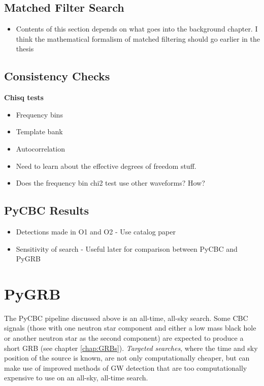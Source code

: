 \documentclass[11pt]{cuthesis}
\begin{document}
\subsection{Matched Filter Search}
\begin{itemize}
\item Contents of this section depends on what goes into the background chapter. I think the mathematical formalism of matched filtering should go earlier in the thesis
\end{itemize}

\subsection{Consistency Checks} \label{sec:chi2}
\textbf{Chisq tests}
\begin{itemize}
\item Frequency bins
\item Template bank
\item Autocorrelation 
\item Need to learn about the effective degrees of freedom stuff. 
\item Does the frequency bin chi2 test use other waveforms? How? 
\end{itemize}

\subsection{PyCBC Results}
\begin{itemize}
\item Detections made in O1 and O2 - Use catalog paper
\item Sensitivity of search - Useful later for comparison between PyCBC and PyGRB
\end{itemize}

\section{PyGRB} \label{sec:PyGRB}
The PyCBC pipeline discussed above is an all-time, all-sky search. Some CBC signals (those with one neutron star component and either a low mass black hole or another neutron star as the second component) are expected to produce a short GRB (see chapter \ref{chap:GRBs}). \textit{Targeted searches}, where the time and sky position of the source is known, are not only computationally cheaper, but can make use of improved methods of GW detection that are too computationally expensive to use on an all-sky, all-time search.
\end{document}
